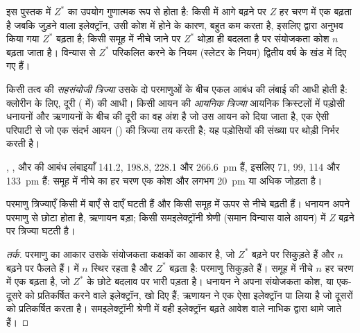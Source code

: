 \begin{remark}[एक गुणात्मक साधन]\label{rem:b1:periodicity:slater}
इस पुस्तक में $Z^{*}$ का उपयोग गुणात्मक रूप से होता है: किसी  में आगे
बढ़ने पर $Z$ हर चरण में एक बढ़ता है जबकि जुड़ने वाला इलेक्ट्रॉन, उसी कोश
में होने के कारण, बहुत कम  करता है, इसलिए  द्वारा
अनुभव किया गया $Z^{*}$ बढ़ता है; किसी समूह में नीचे जाने पर $Z^{*}$ थोड़ा ही बदलता है
पर संयोजकता कोश $n$ बढ़ता जाता है। विन्यास से $Z^{*}$ परिकलित करने के नियम
(स्लेटर के नियम) द्वितीय वर्ष के खंड में दिए गए हैं।
\end{remark}

\begin{definition}\label{def:b1:periodicity:radius}
किसी तत्व की \emph{सहसंयोजी त्रिज्या} उसके दो
परमाणुओं के बीच एकल आबंध की लंबाई की आधी होती है: क्लोरीन के लिए,
 दूरी ( में) की आधी। किसी आयन की \emph{आयनिक
त्रिज्या} आयनिक क्रिस्टलों में पड़ोसी धनायनों और
ऋणायनों के बीच की दूरी का वह अंश है जो उस आयन को दिया जाता है, एक ऐसी
परिपाटी से जो एक संदर्भ आयन () की त्रिज्या तय करती है; यह
पड़ोसियों की संख्या पर थोड़ी निर्भर करती है।
\end{definition}

\begin{example}[हैलोजन]\label{ex:b1:periodicity:halogen-radii}
, ,  और  की आबंध लंबाइयाँ 141.2,
198.8, 228.1 और \qty{266.6}{pm} हैं, इसलिए  71, 99, 114
और \qty{133}{pm} हैं: समूह में नीचे का हर चरण एक कोश और लगभग
\qty{20}{pm} या अधिक जोड़ता है।
\end{example}

\begin{proposition}[त्रिज्या की प्रवृत्तियाँ]\label{prop:b1:periodicity:radius-trend}
परमाणु त्रिज्याएँ किसी  में बाएँ से दाएँ घटती हैं और किसी समूह में ऊपर से
नीचे बढ़ती हैं। धनायन अपने परमाणु से छोटा होता है, ऋणायन
बड़ा; किसी समइलेक्ट्रॉनी श्रेणी (समान विन्यास वाले आयन) में
$Z$ बढ़ने पर त्रिज्या घटती है।
\end{proposition}

\begin{proof}[तर्क]
परमाणु का आकार उसके संयोजकता कक्षकों का आकार है, जो $Z^{*}$ बढ़ने पर
सिकुड़ते हैं और $n$ बढ़ने पर फैलते हैं।  में $n$ स्थिर रहता है
और $Z^{*}$ बढ़ता है: परमाणु सिकुड़ते हैं। समूह में नीचे $n$ हर चरण में एक बढ़ता है,
जो $Z^{*}$ के छोटे बदलाव पर भारी पड़ता है। धनायन ने अपना
संयोजकता कोश, या एक-दूसरे को प्रतिकर्षित करने वाले इलेक्ट्रॉन, खो दिए हैं; ऋणायन ने
एक ऐसा इलेक्ट्रॉन पा लिया है जो दूसरों को प्रतिकर्षित करता है। समइलेक्ट्रॉनी श्रेणी में
वही इलेक्ट्रॉन बढ़ते आवेश वाले नाभिक द्वारा थामे जाते हैं।
\end{proof}

